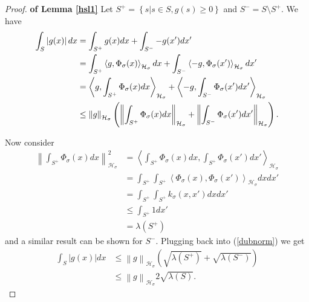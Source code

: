 \documentclass{article} %
\def\hsig{{\mathcal{H}_\sigma}}
\def\l{\left}
\def\r{\right}
\theoremstyle{definition}
\begin{document}
\begin{proof}{\bf of Lemma \ref{hsl1}}
	Let $S^+ = \l\{s| s \in S,g(s)\ge0 \r\}$ and $S^- = S\setminus S^+$. We have
	\begin{eqnarray}
		\int_S \l|g(x)\r| dx \notag
		&= \int_{S^+} g(x)dx +\int_{S^-}-g(x')dx'\\ \notag
		&= \int_{S^+} \l<g,\Phi_\sigma(x)\r>_\hsig dx +\int_{S^-}\l<-g,\Phi_\sigma(x')\r>_\hsig dx'\\\notag
		&=  \l<g,\int_{S^+}\Phi_\sigma(x)dx\r>_\hsig +\l<-g,\int_{S^-}\Phi_\sigma(x')dx'\r>_\hsig\\ 
		&\le \l\| g \r\|_\hsig \l( \l\| \int_{S^+}\Phi_\sigma(x)dx \r\|_\hsig + \l\| \int_{S^-}\Phi_\sigma(x')dx' \r\|_\hsig \r) \label{dubnorm}.
	\end{eqnarray}

	Now consider
	\begin{eqnarray*}
		\l\| \int_{S^+}\Phi_\sigma(x)dx \r\|_\hsig^2
		&= \l< \int_{S^+}\Phi_\sigma(x)dx,\int_{S^+}\Phi_\sigma(x')dx' \r>_\hsig\\
		&= \int_{S^+}\int_{S^+} \l<\Phi_\sigma(x), \Phi_\sigma(x')\r>_\hsig dx dx'\\
		&=\int_{S^+}\int_{S^+} k_\sigma\l(x,x'\r) dxdx'\\
		&\le  \int_{S^+} 1 dx'\\
		&= \lambda(S^+)
	\end{eqnarray*}
	and a similar result can be shown for $S^-$. Plugging back into (\ref{dubnorm}) we get
	\begin{eqnarray*}
		\int_S \l|g(x)\r| dx
		&\le \l\| g \r\|_\hsig \l( \sqrt{\lambda\l(S^+\r)} + \sqrt{\lambda\l(S^-\r)} \r)\\
		&\le \l\| g \r\|_\hsig 2\sqrt{\lambda\l(S\r)}.
	\end{eqnarray*}
\end{proof}
\end{document}

